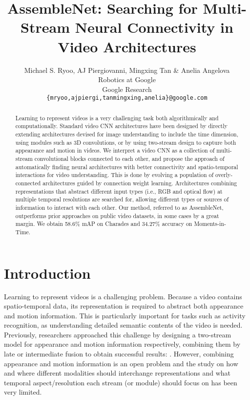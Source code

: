 \documentclass{article} \usepackage{iclr2020_conference,times}
\title{AssembleNet: Searching for Multi-Stream Neural Connectivity in Video Architectures}
\author{Michael S. Ryoo, AJ Piergiovanni, Mingxing Tan \& Anelia Angelova\\
Robotics at Google\\
Google Research\\
\texttt{\{mryoo,ajpiergi,tanmingxing,anelia\}@google.com}
}
\begin{document}
\maketitle


\begin{abstract}
Learning to represent videos is a very challenging task both algorithmically and computationally. Standard video CNN architectures have been designed by directly extending architectures devised for image understanding to include the time dimension, using modules such as 3D convolutions, or by using two-stream design to capture both appearance and motion in videos. We interpret a video CNN as a collection of multi-stream convolutional blocks connected to each other, and propose the approach of automatically finding neural architectures with better connectivity and spatio-temporal interactions for video understanding.
This is done by evolving a population of overly-connected architectures guided by connection weight learning. 
Architectures combining representations that abstract different input types (i.e., RGB and optical flow) at multiple temporal resolutions are searched for, allowing different types or sources of information to interact with each other. Our method, referred to as AssembleNet, outperforms prior approaches on public video datasets, in some cases by a great margin. We obtain 58.6\% mAP on Charades and 34.27\% accuracy on Moments-in-Time.
\end{abstract}


\section{Introduction}


Learning to represent videos is a challenging problem. Because a video contains spatio-temporal data, its representation is required to abstract both appearance and motion information. This is particularly important for tasks such as activity recognition, as understanding detailed semantic contents of the video is needed. Previously, researchers approached this challenge by designing a two-stream model for appearance and motion information respectively, combining them by late or intermediate fusion to obtain successful results: \cite{simonyan2014two,feichtenhofer2016convolutional,feichtenhofer2016tsres,feichtenhofer2017tsmult,feichtenhofer2018slowfast}. However, combining appearance and motion information is an open problem and 
the study on how and where different modalities should interchange representations and what temporal aspect/resolution each stream (or module) should focus on has been very limited.
\end{document}
